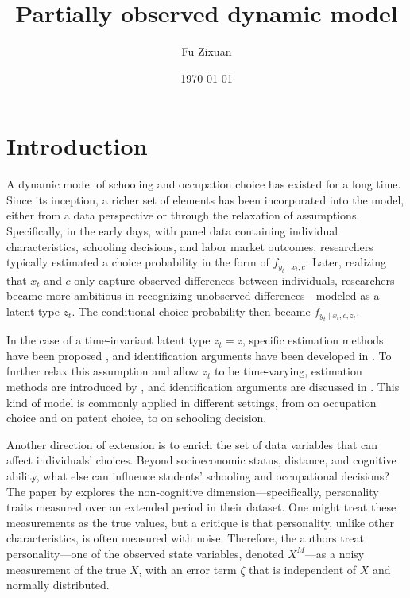 \documentclass[12pt]{article}
\title{\textbf{Partially observed dynamic model}}
\author{Fu Zixuan}
\date{\today}
\begin{document}
\maketitle




\section{Introduction}
A dynamic model of schooling and occupation choice has existed for a long time. Since its inception, a richer set of elements has been incorporated into the model, either from a data perspective or through the relaxation of assumptions. Specifically, in the early days, with panel data containing individual characteristics, schooling decisions, and labor market outcomes, researchers typically estimated a choice probability in the form of $f_{y_t \mid x_t, c}$. Later, realizing that $x_t$ and $c$ only capture observed differences between individuals, researchers became more ambitious in recognizing unobserved differences—modeled as a latent type $z_t$. The conditional choice probability then became $f_{y_t \mid x_t, c, z_t}$.

In the case of a time-invariant latent type $z_t=z$, specific estimation methods have been proposed \citep{aguirregabiria2007sequential}, and identification arguments have been developed in \cite{kasahara2009nonparametric}. To further relax this assumption and allow $z_t$ to be time-varying, estimation methods are introduced by \citet{arcidiacono2008ccp}, and identification arguments are discussed in \citet{hu2012nonparametric}. This kind of model is commonly applied in different settings, from \citet{miller1984job} on occupation choice and \citet{pakes1986patents} on patent choice, to \citet{arcidiacono2005affirmative} on schooling decision.

Another direction of extension is to enrich the set of data variables that can affect individuals’ choices. Beyond socioeconomic status, distance, and cognitive ability, what else can influence students' schooling and occupational decisions? The paper by \citet{todd2020dynamic} explores the non-cognitive dimension—specifically, personality traits measured over an extended period in their dataset. One might treat these measurements as the true values, but a critique is that personality, unlike other characteristics, is often measured with noise. Therefore, the authors treat personality—one of the observed state variables, denoted $X^M$—as a noisy measurement of the true $X$, with an error term $\zeta$ that is independent of $X$ and normally distributed.
\end{document}
